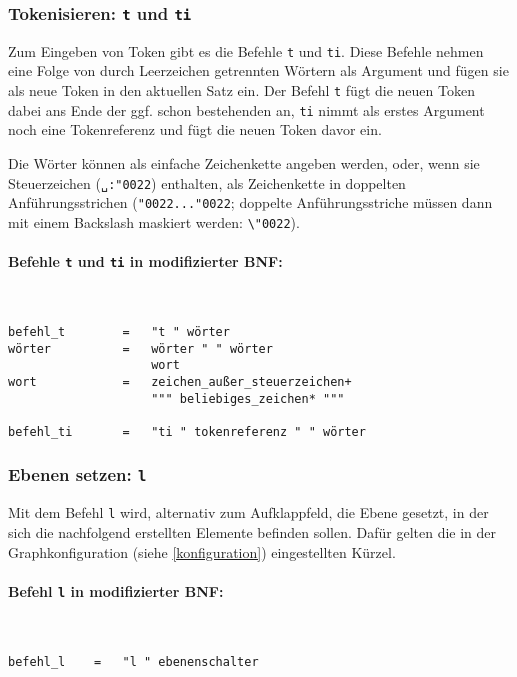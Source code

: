 \documentclass[12pt]{scrartcl}
\begin{document}
\subsubsection{Tokenisieren: \texttt{t} und \texttt{ti}}

Zum Eingeben von Token gibt es die Befehle \texttt{t} und \texttt{ti}. Diese Befehle nehmen eine Folge von durch Leerzeichen getrennten Wörtern als Argument und fügen sie als neue Token in den aktuellen Satz ein. Der Befehl \texttt{t} fügt die neuen Token dabei ans Ende der ggf. schon bestehenden an, \texttt{ti} nimmt als erstes Argument noch eine Tokenreferenz und fügt die neuen Token davor ein.

Die Wörter können als einfache Zeichenkette angeben werden, oder, wenn sie Steuerzeichen (\texttt{␣:\char"0022}) enthalten, als Zeichenkette in doppelten Anführungsstrichen (\texttt{\char"0022...\char"0022}; doppelte Anführungsstriche müssen dann mit einem Backslash maskiert werden: \texttt{\textbackslash\char"0022}).

\paragraph*{Befehle \texttt{t} und \texttt{ti} in modifizierter BNF:}
~
\begin{framed}
\begin{lstlisting}
befehl_t        =   "t " wörter
wörter          =   wörter " " wörter
                    wort
wort            =   zeichen_außer_steuerzeichen+
                    """ beliebiges_zeichen* """

befehl_ti       =   "ti " tokenreferenz " " wörter
\end{lstlisting}
\end{framed}


\subsubsection{Ebenen setzen: \texttt{l}}\label{l}

Mit dem Befehl \texttt{l} wird, alternativ zum Aufklappfeld, die Ebene gesetzt, in der sich die nachfolgend erstellten Elemente befinden sollen. Dafür gelten die in der Graphkonfiguration (siehe \ref{konfiguration}) eingestellten Kürzel.

\paragraph*{Befehl \texttt{l} in modifizierter BNF:}
~
\begin{framed}
\begin{lstlisting}
befehl_l    =   "l " ebenenschalter
\end{lstlisting}
\end{framed}
\end{document}
